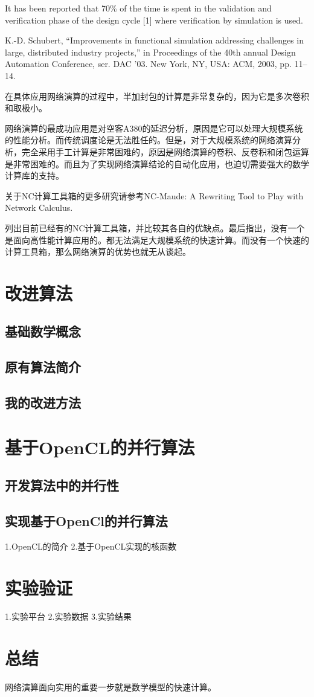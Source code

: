 \documentclass[10pt,journal]{IEEEtran}
\begin{document}
It has been reported that 70\% of the time is spent in the validation and verification phase of the design cycle [1] where verification by simulation is used.

K.-D. Schubert, “Improvements in functional simulation addressing
challenges in large, distributed industry projects,” in Proceedings
of the 40th annual Design Automation Conference, ser. DAC ’03.
New York, NY, USA: ACM, 2003, pp. 11–14.

在具体应用网络演算的过程中，半加封包的计算是非常复杂的，因为它是多次卷积和取极小。

网络演算的最成功应用是对空客A380的延迟分析，原因是它可以处理大规模系统的性能分析。而传统调度论是无法胜任的。但是，对于大规模系统的网络演算分析，完全采用手工计算是非常困难的，原因是网络演算的卷积、反卷积和闭包运算是非常困难的。而且为了实现网络演算结论的自动化应用，也迫切需要强大的数学计算库的支持。

关于NC计算工具箱的更多研究请参考NC-Maude: A Rewriting Tool to Play with Network Calculus.

列出目前已经有的NC计算工具箱，并比较其各自的优缺点。最后指出，没有一个是面向高性能计算应用的。都无法满足大规模系统的快速计算。而没有一个快速的计算工具箱，那么网络演算的优势也就无从谈起。

\section{改进算法}
\subsection{基础数学概念}
\subsection{原有算法简介}
\subsection{我的改进方法}

\section{基于OpenCL的并行算法}
\subsection{开发算法中的并行性}
\subsection{实现基于OpenCl的并行算法}
1.OpenCL的简介
2.基于OpenCL实现的核函数

\section{实验验证}\label{experiments}
1.实验平台
2.实验数据
3.实验结果

\section{总结}
网络演算面向实用的重要一步就是数学模型的快速计算。



\end{document}
